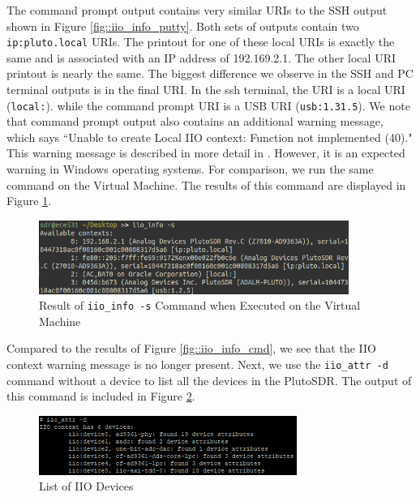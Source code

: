 \documentclass{article}
\begin{document}
The command prompt output contains very similar URIs to the SSH output shown in Figure \ref{fig::iio_info_putty}. Both sets of outputs contain two \texttt{ip:pluto.local} URIs. The printout for one of these local URIs is exactly the same and is associated with an IP address of 192.169.2.1. The other local URI printout is nearly the same. The biggest difference we observe in the SSH and PC terminal outputs is in the final URI. In the ssh terminal, the URI is a local URI (\texttt{local:}). while the command prompt URI is a USB URI (\texttt{usb:1.31.5}). We note that command prompt output also contains an additional warning message, which says ``Unable to create Local IIO context: Function not implemented (40)." This warning message is described in more detail in \cite{analog_devices_libiio_error}. However, it is an expected warning in Windows operating systems. For comparison, we run the same command on the Virtual Machine. The results of this command are displayed in Figure \ref{fig::iio_info_vm}.

\begin{figure}[H]
	\centerline{\includegraphics[width=0.9\textwidth]{iio_info_vm.png}}
	\caption{Result of \texttt{iio\_info -s} Command when Executed on the Virtual Machine}
	\label{fig::iio_info_vm}
\end{figure}

Compared to the results of Figure \ref{fig::iio_info_cmd}, we see that the IIO context warning message is no longer present. Next, we use the \texttt{iio\_attr -d} command without a device to list all the devices in the PlutoSDR. The output of this command is included in Figure \ref{fig::iio_devices}.

\begin{figure}[H]
	\centerline{\includegraphics[width=0.75\textwidth]{iio_devices.png}}
	\caption{List of IIO Devices}
	\label{fig::iio_devices}
\end{figure}
\end{document}

